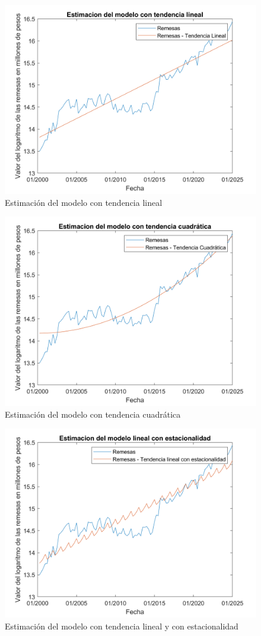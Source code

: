 \documentclass{article}
\theoremstyle{remark}
\theoremstyle{definition}
\begin{document}
\begin{enumerate}[label=\emph{\alph*})]
\begin{tcolorbox}[title=Soluci\'on 3.c]
        \begin{figure}[H]
            \centering
            \includegraphics[width=0.5\linewidth]{docs/Remesas_tendencia_lineal.png}
            \caption{Estimación del modelo con tendencia lineal}
            \label{fig:enter-label}
        \end{figure}
            \begin{figure}[H]
                \centering
                \includegraphics[width=0.5\linewidth]{docs/Remesas_tendencia_cuadratica.png}
                \caption{Estimación del modelo con tendencia cuadrática}
                \label{fig:enter-label}
            \end{figure}


       \begin{figure}[H]
            \centering
            \includegraphics[width=0.5\linewidth]{docs/Remesas_estacionalidad.png}
            \caption{Estimación del modelo con tendencia lineal y con estacionalidad}
            \label{fig:enter-label}
        \end{figure}
        

\end{tcolorbox}
\end{enumerate}
\end{document}
